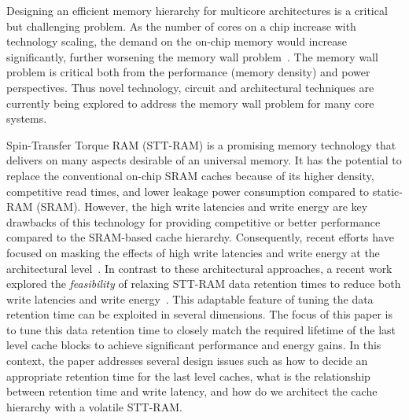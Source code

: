 
Designing an efficient memory hierarchy for multicore architectures is a critical but challenging
problem. As the number of cores on a chip increase with technology scaling, the demand on the on-chip
memory would increase significantly, further worsening the memory wall problem~\cite{BurgerGK96}. The
memory wall problem is critical both from the performance (memory density) and power perspectives.
Thus novel technology, circuit and architectural techniques are currently being explored to address
the memory wall problem for many core systems.




Spin-Transfer Torque RAM (STT-RAM) is a promising memory technology that delivers on many aspects
desirable of an universal memory. It has the potential to replace the conventional on-chip SRAM
caches because of its higher density, competitive read times, and lower leakage power consumption
compared to static-RAM (SRAM). However, the high write latencies and write energy are key drawbacks
of this technology for providing competitive or better performance compared to the SRAM-based cache
hierarchy. Consequently, recent efforts have focused on masking the effects of high write latencies
and write energy at the architectural level~\cite{mram-energy-reduction,gsun-hpca,}. In contrast to
these architectural approaches, a recent  work explored the {\it feasibility} of relaxing STT-RAM
data retention times to reduce both write latencies and write energy~\cite{STTRAM:HPCA11}. This
adaptable feature of tuning the data retention time can be exploited in several dimensions. The focus
of this paper is to tune this data retention time to closely match the required lifetime of the last
level cache blocks to achieve significant performance and energy gains. In this context, the paper
addresses several design issues such as how to decide an appropriate retention time for the last
level caches, what is the relationship between retention time and write latency, and how do we
architect the cache hierarchy with a volatile STT-RAM.

